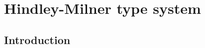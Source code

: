 \documentclass[a4paper,oneside]{memoir}
\begin{document}
\makeatletter
\newcommand{\removelatexerror}{\let\@latex@error\@gobble}
\makeatother

\newcommand{\la}{\leftarrow\xspace}












\newcommand{\inhab}[1]{\op{I}(#1)}

\newcommand{\tord}{\preccurlyeq}
\newcommand{\stord}{\prec}
\newcommand{\ordt}{\tord_\tau}
\newcommand{\tek}{\sim}
\newcommand{\ntek}{\nsim}
\newcommand{\ekt}{\tek_\tau}
\newcommand{\nekt}{\ntek_\tau}
\newcommand{\nsucct}{\nsucc_\tau}

\newcommand{\MGI}[1]{\op{MGI}(#1)}
\newcommand{\MGIt}{\MGI{\tau}}
\newcommand{\It}{\op{I}(\tau)}

\newcommand{\ids}{\sigma_{\op{id}}}

\newcommand{\U}[2]{\op{U}(#1,#2)}
\newcommand{\Utt}{\U{\tau}{\tauPr}}
\newcommand{\MGUtt}{\MGU{\tau}{\tauPr}}

\newcommand{\e}[2]{\op{E}_{#1}(#2)}
\newcommand{\restrict}[2]{{#1}_{\mid #2}}
\newcommand{\fresh}[2]{\op{fresh}_{#1}(#2)}
\newcommand{\newVar}[1]{\op{newVar}(#1)}
\newcommand{\Ss}[1]{\op{ss}(#1)}
\newcommand{\TS}[2]{\op{ts}_{#1}(#2)}
\newcommand{\ts}[2]{\op{ts}_{#1}(#2)}
\newcommand{\TSij}[3]{\op{ts}_{#1,#2}(#3)}
\newcommand{\trees}[2]{\op{trees}_{#1}(#2)}
\newcommand{\FX}{\ap{F}{X}}
\newcommand{\sF}{\s_{F}}
\newcommand{\sX}{\s_{X}}
\newcommand{\vars}[1]{\op{vars}(#1)}
\newcommand{\dom}[1]{\op{dom}(#1)}
\newcommand{\IH}{induction hypothesis\xspace}
\newcommand{\discup}{~\mathbin{\dot{\cup}}~}






\chapter{Hindley-Milner type system}


\newcommand{\letin}[3]{\texttt{let} \, #1 = #2 \, \texttt{in} \, #3}
\newcommand{\W}{\op{\textbf{W}}}
\newcommand{\Mgu}{\op{\textbf{MGU}}}
\newcommand{\where}{\op{\textbf{where~}}}
\newcommand{\SPr}{S^\prime}


\section{Introduction}
\end{document}
